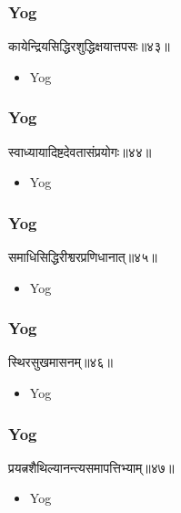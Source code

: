 \begin{frame}[fragile]\frametitle{Yog}
\begin{sanskrit}
कायेन्द्रियसिद्धिरशुद्धिक्षयात्तपसः॥४३॥
\end{sanskrit}
	\begin{itemize}
	\item Yog 
	\end{itemize}
\end{frame}


\begin{frame}[fragile]\frametitle{Yog}
\begin{sanskrit}
स्वाध्यायादिष्टदेवतासंप्रयोगः॥४४॥
\end{sanskrit}
	\begin{itemize}
	\item Yog 
	\end{itemize}
\end{frame}


\begin{frame}[fragile]\frametitle{Yog}
\begin{sanskrit}
समाधिसिद्धिरीश्वरप्रणिधानात्॥४५॥
\end{sanskrit}
	\begin{itemize}
	\item Yog 
	\end{itemize}
\end{frame}


\begin{frame}[fragile]\frametitle{Yog}
\begin{sanskrit}
स्थिरसुखमासनम्॥४६॥
\end{sanskrit}
	\begin{itemize}
	\item Yog 
	\end{itemize}
\end{frame}


\begin{frame}[fragile]\frametitle{Yog}
\begin{sanskrit}
प्रयत्नशैथिल्यानन्त्यसमापत्तिभ्याम्॥४७॥
\end{sanskrit}
	\begin{itemize}
	\item Yog 
	\end{itemize}
\end{frame}

